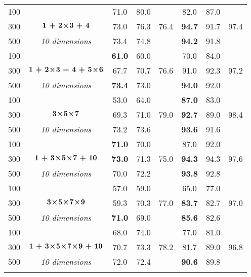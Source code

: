 \begin{table} [!ht]
\begin{center}
{\begin{tabular}{c  c | c  c c  | c  c c  }
100	&		&	  71.0 	&	 80.0 	&	 	&	 82.0 	&	 87.0 	&	 \\ 
300	&	$ \bm { {1} \, + \, {2\! \times \! 3} \, + \, {4} } $ 	&	 73.0 	&	 76.3 	&	 76.4 	&	 \textbf{94.7} 	&	 91.7 	&	 97.4 \\ 
500	&	\emph{10 dimensions}	&	 73.4 	&	 74.8 	&	 	&	 \textbf{94.2} 	&	 91.8 	&	 \\  \hline
														
														
100	&	 	&	 \textbf{61.0} 	&	 	60.0 	&	 	 	&	  70.0 	&	 	84.0 	&	 \\ 
300	&	$\bm{{1} \, + \, {2\! \times \! 3} \, + \, {4} \, + \, {5\! \times \! 6}  } $ 	&	 67.7 	&	 	70.7 	&	  76.6 	&	  91.0 	&	 	92.3 	&	 97.2 \\ 
500	&	\emph{10 dimensions}	&	 \textbf{73.4} 	&	 	73.0 	&	 	 	&	  \textbf{94.0} 	&	 	92.0 	&	  \\  \hline
														
														
														
100	&		&	  53.0 	&	 64.0 	&	 	&	 \textbf{87.0} 	&	 83.0 	&	  \\ 
300	&	$\bm{{3\! \times \!5\! \times \!7}} $ 	&	 69.3 	&	 71.0 	&	 79.0 	&	 \textbf{92.7} 	&	 89.0 	&	 98.4  \\ 
500	&	\emph{10 dimensions}	&	 {73.2} 	&	 73.6 	&	 	&	 \textbf{93.6} 	&	 91.6 	&	  \\    \hline
														
														
100	&	 	&	 \textbf{71.0}  	&	 70.0 	&	 		&	 87.0 	&	 92.0 	&	 \\  
300	&	$\bm{{1} \, + \, {3\! \times \!5\! \times \!7}  \, + \,  {10}} $ 	&	 \textbf{73.0}  	&	 71.3 	&	 75.0 	&	 \textbf{94.3} 	&	 94.3 	&	 97.6 \\ 
500	&	\emph{10 dimensions}	&	  70.0  	&	 72.2 	&	 		&	 \textbf{93.8} 	&	 92.8 	&	 \\ \hline
														
														
100	&		&	 57.0 	&	 59.0 	&	  	&		65.0 	&	 77.0 	&	 \\ 
300	&	$\bm{{3\! \times \!5\! \times \!7\! \times \!9}} $ 	&	 59.3 	&	 70.3 	&	 77.0 	&	    \textbf{83.7} 	&	 82.7 	&	 97.0  \\ 
500	&	\emph{10 dimensions}	&	 \textbf{71.0} 	&	 	69.0 	&	 	&	 \textbf{85.6} 	&	 82.6 	&	 \\   \hline
														
														
100	&	 	&	 68.0 	&	 74.0 	&	  	&	 77.0 	&	 	81.0 	&	  \\ 
300	&	$\bm{ {1} \, + \, {3\! \times \! 5\! \times \! 7\! \times \! 9}  \, + \, {10} }$  	&	 70.7 	&	 73.3 	&	 78.2 	&	 81.7 	&	 89.0 	&	  96.8 \\ 
500	&	\emph{10 dimensions} 	&	 72.0 	&	 72.4 	&	  	&	 \textbf{90.6} 	&	 	89.8 	&	  \\ 
\multicolumn{8}{c}{} \\


\end{tabular}}
\end{center}
\end{table}
